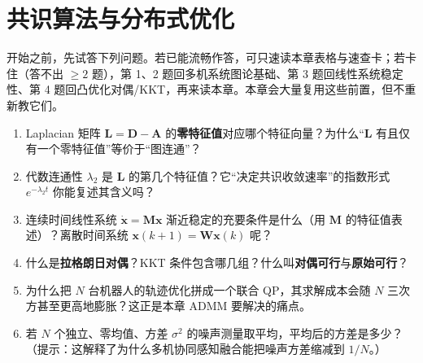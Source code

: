 \chapter{共识算法与分布式优化}
\label{ch:mr-consensus}


\providecommand{\sgn}{\operatorname{sign}}
\providecommand{\Real}{\operatorname{Re}}
\providecommand{\sigp}{\operatorname{sig}}
\providecommand{\argminop}{\operatorname*{arg\,min}}
\providecommand{\proxop}{\operatorname{prox}}


\begin{practice}[前置自测]
开始之前，先试答下列问题。若已能流畅作答，可只速读本章表格与速查卡；若卡住（答不出 $\ge 2$ 题），第 1、2 题回多机系统图论基础、第 3 题回线性系统稳定性、第 4 题回凸优化对偶/KKT，再来读本章。本章会大量复用这些前置，但不重新教它们。
\begin{enumerate}
  \item Laplacian 矩阵 $\mathbf{L}=\mathbf{D}-\mathbf{A}$ 的\textbf{零特征值}对应哪个特征向量？为什么“$\mathbf{L}$ 有且仅有一个零特征值”等价于“图连通”？
  \item 代数连通性 $\lambda_2$ 是 $\mathbf{L}$ 的第几个特征值？它“决定共识收敛速率”的指数形式 $e^{-\lambda_2 t}$ 你能复述其含义吗？
  \item 连续时间线性系统 $\dot{\mathbf{x}}=\mathbf{M}\mathbf{x}$ 渐近稳定的充要条件是什么（用 $\mathbf{M}$ 的特征值表述）？离散时间系统 $\mathbf{x}(k{+}1)=\mathbf{W}\mathbf{x}(k)$ 呢？
  \item 什么是\textbf{拉格朗日对偶}？KKT 条件包含哪几组？什么叫\textbf{对偶可行}与\textbf{原始可行}？
  \item 为什么把 $N$ 台机器人的轨迹优化拼成一个联合 QP，其求解成本会随 $N$ 三次方甚至更高地膨胀？这正是本章 ADMM 要解决的痛点。
  \item 若 $N$ 个独立、零均值、方差 $\sigma^2$ 的噪声测量取平均，平均后的方差是多少？（提示：这解释了为什么多机协同感知融合能把噪声方差缩减到 $1/N$。）
\end{enumerate}
\end{practice}

